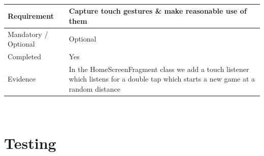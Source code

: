 \documentclass[10pt, a4paper]{article}
\begin{document}
\\
\linebreak
\linebreak
\begin{tabular}{| p{} | p{} |}
\hline 
Requirement & Capture touch gestures \& make reasonable use of them \\ 
\hline 
Mandatory / Optional & Optional \\ 
\hline 
Completed & Yes \\ 
\hline 
Evidence & In the HomeScreenFragment class we add a touch listener which listens for a double tap which starts a new game at a random distance \\ 
\hline 
\end{tabular} 
\\
\section*{Testing}
\end{document}
